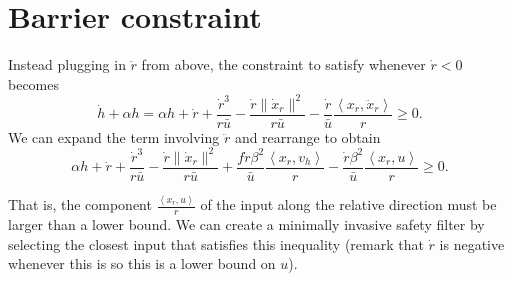 \documentclass[letterpaper, 12pt]{article}
\begin{document}
\section{Barrier constraint}

Instead plugging in $\ddot r$ from above, the constraint to satisfy whenever $\dot r < 0$ becomes
\begin{equation}
	\dot h + \alpha h = \alpha h + \dot r + \frac{\dot r^3}{r \bar u} - \frac{\dot r \| \dot x_r\|^2}{r \bar u} - \frac{\dot r}{\bar u} \frac{\left\langle x_r, \ddot x_r \right\rangle}{r} \geq 0.
\end{equation}
We can expand the term involving $\ddot r$ and rearrange to obtain
\begin{equation}
	\alpha h + \dot r + \frac{\dot r^3}{r \bar u} - \frac{\dot r \| \dot x_r\|^2}{r \bar u} + \frac{f \dot r \beta^2}{\bar u} \frac{\left\langle x_r, v_h \right\rangle}{r} - \frac{\dot r \beta^2}{\bar u} \frac{\left\langle x_r, u \right\rangle}{r} \geq 0.
\end{equation}

That is, the component $\frac{\left\langle x_r, u \right\rangle}{r}$ of the input along the relative direction must be larger than a lower bound. We can create a minimally invasive safety filter by selecting the closest input that satisfies this inequality (remark that $\dot r$ is negative whenever this is so this is a lower bound on $u$).
\end{document}
